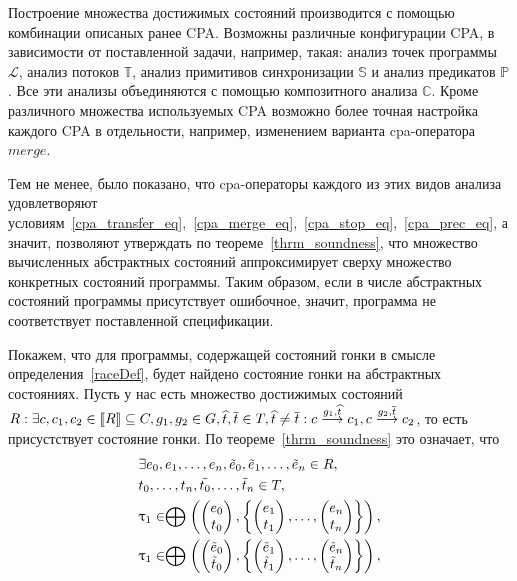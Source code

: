 Построение множества достижимых состояний производится с помощью комбинации описаных ранее CPA.
Возможны различные конфигурации CPA, в зависимости от поставленной задачи, например, такая: анализ точек программы $\mathcal{L}$, анализ потоков $\mathbb{T}$, анализ примитивов синхронизации $\mathbb{S}$ и анализ предикатов $\mathbb{P}$. Все эти анализы объединяются с помощью композитного анализа $\mathbb{C}$.
Кроме различного множества используемых CPA возможно более точная настройка каждого CPA в отдельности, например, изменением варианта cpa-оператора $merge$.

Тем не менее, было показано, что cpa-операторы каждого из этих видов анализа удовлетворяют условиям~\ref{cpa_transfer_eq},~\ref{cpa_merge_eq},~\ref{cpa_stop_eq},~\ref{cpa_prec_eq}, а значит, позволяют утверждать по теореме~\ref{thrm_soundness}, что множество вычисленных абстрактных состояний аппроксимирует сверху множество конкретных состояний программы.
Таким образом, если в числе абстрактных состояний программы присутствует ошибочное, значит, программа не соответствует поставленной спецификации.

Покажем, что для программы, содержащей состояний гонки в смысле определения~\ref{raceDef}, будет найдено состояние гонки на абстрактных состояниях.
Пусть у нас есть множество достижимых состояний $R: \exists c, c_1, c_2 \in [\![ R ]\!] \subseteq C, g_1, g_2 \in G, \widehat{t}, \overline{t} \in T, \widehat{t} \neq \overline{t}: c \stackrel{g_1, \widehat{t}}{\longrightarrow} c_1, c \stackrel{g_2, \overline{t}}{\longrightarrow} c_2$, то есть присустствует состояние гонки.
По теореме~\ref{thrm_soundness} это означает, что 
\begin{align*}
& \exists e_0, e_1, \dots, e_n, \tilde{e}_0, \tilde{e}_1, \dots, \tilde{e}_n \in R, \\
& t_0, \dots, t_n, \tilde{t_0}, \dots, \tilde{t}_n \in T, \\
& \uptau_1 \in \mathrel{\bigoplus}
\left(
\begin{pmatrix}
e_0 \\
t_0 
\end{pmatrix},
\left\{
\begin{pmatrix}
e_1 \\
t_1 
\end{pmatrix},
\dots ,
\begin{pmatrix}
e_n \\
t_n 
\end{pmatrix}
\right\}
\right), \\
& \uptau_1 \in \mathrel{\bigoplus}
\left(
\begin{pmatrix}
\tilde{e}_0 \\
\tilde{t}_0 
\end{pmatrix},
\left\{
\begin{pmatrix}
\tilde{e}_1 \\
\tilde{t}_1 
\end{pmatrix},
\dots ,
\begin{pmatrix}
\tilde{e}_n \\
\tilde{t}_n 
\end{pmatrix}
\right\}
\right), \\
\end{align*}

